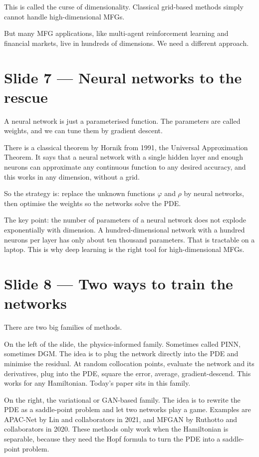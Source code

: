 \documentclass[11pt]{article}
\begin{document}
This is called the curse of dimensionality.  Classical grid-based methods
simply cannot handle high-dimensional MFGs.

But many MFG applications, like multi-agent reinforcement learning and
financial markets, live in hundreds of dimensions.  We need a different
approach.

\section*{Slide 7 --- Neural networks to the rescue}

A neural network is just a parameterised function.  The parameters are
called weights, and we can tune them by gradient descent.

There is a classical theorem by Hornik from 1991, the Universal
Approximation Theorem.  It says that a neural network with a single
hidden layer and enough neurons can approximate any continuous function
to any desired accuracy, and this works in any dimension, without a grid.

So the strategy is: replace the unknown functions $\varphi$ and $\rho$ by
neural networks, then optimise the weights so the networks solve the PDE.

The key point: the number of parameters of a neural network does not
explode exponentially with dimension.  A hundred-dimensional network with
a hundred neurons per layer has only about ten thousand parameters.
That is tractable on a laptop.  This is why deep learning is the right
tool for high-dimensional MFGs.

\section*{Slide 8 --- Two ways to train the networks}

There are two big families of methods.

On the left of the slide, the physics-informed family.  Sometimes called
PINN, sometimes DGM.  The idea is to plug the network directly into the
PDE and minimise the residual.  At random collocation points, evaluate
the network and its derivatives, plug into the PDE, square the error,
average, gradient-descend.  This works for any Hamiltonian.  Today's
paper sits in this family.

On the right, the variational or GAN-based family.  The idea is to
rewrite the PDE as a saddle-point problem and let two networks play a
game.  Examples are APAC-Net by Lin and collaborators in 2021, and
MFGAN by Ruthotto and collaborators in 2020.  These methods only work
when the Hamiltonian is separable, because they need the Hopf formula to
turn the PDE into a saddle-point problem.
\end{document}
